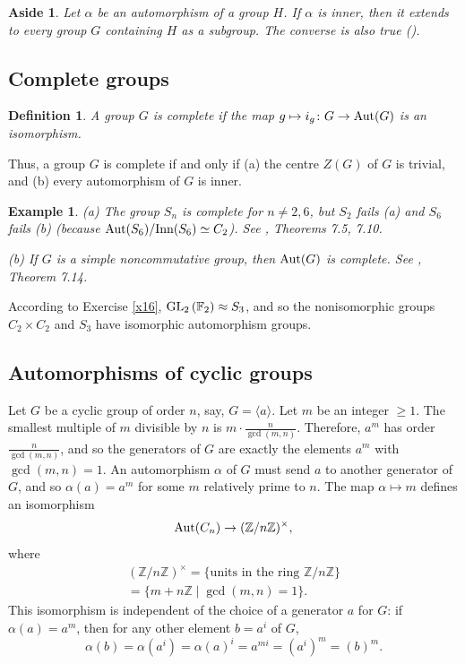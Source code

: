 \documentclass[a4paper,11pt,final]{memoir}%
\newtheorem{definition}[X]{Definition}
\newtheorem{example}[X]{Example}
\newtheorem{aside}[X]{Aside}
\theoremstyle{nonumberplain}
\begin{document}
\begin{aside}
\label{it100b}Let $\alpha$ be an automorphism of a group $H$. If $\alpha$ is
inner, then it extends to every group $G$ containing $H$ as a subgroup. The
converse is also true (\cite{schupp1987}).
\end{aside}

\subsection{Complete groups}

\begin{definition}
\label{it00b}A group $G$ is \emph{complete\/}%
if the map $g\mapsto i_{g}\colon G\rightarrow\operatorname{Aut}(G)$ is an isomorphism.
\end{definition}

Thus, a group $G$ is complete if and only if (a) the centre $Z(G)$ of $G$ is
trivial, and (b) every automorphism of $G$ is inner.

\begin{example}
\label{it09} (a) The group $S_{n}$ is complete for $n\neq2,6$, but $S_{2}$
fails (a) and $S_{6}$ fails (b) (because $\operatorname{Aut}(S_{6})/\text{Inn}(S_{6})\simeq
C_{2}$). See \cite{rotman1995}, Theorems 7.5, 7.10.

(b) If $G$ is a simple noncommutative group, then $\operatorname{Aut}(G)$ is complete. See
\cite{rotman1995}, Theorem 7.14.
\end{example}

According to Exercise \ref{x16}, $\operatorname{GL}_{2}\left(  \mathbb{F}{}_{2}\right)
\approx S_{3}$, and so the nonisomorphic groups $C_{2}\times C_{2}$ and
$S_{3}$ have isomorphic automorphism groups.

\subsection{Automorphisms of cyclic groups}

Let $G$ be a cyclic group of order $n$, say, $G=\langle a\rangle$. Let $m$ be
an integer $\geq1$. The smallest multiple of $m$ divisible by $n$ is
$m\cdot\frac{n}{\gcd(m,n)}$. Therefore, $a^{m}$ has order $\frac{n}{\gcd
(m,n)}$, and so the generators of $G$ are exactly the elements $a^{m}$ with
$\gcd(m,n)=1$. An automorphism $\alpha$ of $G$ must send $a$ to another
generator of $G$, and so $\alpha(a)=a^{m}$ for some $m$ relatively prime to
$n$. The map $\alpha\mapsto m$ defines an isomorphism
\[
\operatorname{Aut}(C_{n})\rightarrow(\mathbb{Z}/n\mathbb{Z})^{\times},
\]
where
\begin{align*}
(\mathbb{Z}/n\mathbb{Z})^{\times}=\{\text{units in the ring }\mathbb{Z}%
/n\mathbb{Z}\}\\
=\{m+n\mathbb{Z}\mid\gcd(m,n)=1\}.
\end{align*}
This isomorphism is independent of the choice of a generator $a$ for $G$: if
$\alpha(a)=a^{m}$, then for any other element $b=a^{i}$ of $G$,
\[
\alpha(b)=\alpha(a^{i})=\alpha(a)^{i}=a^{mi}=(a^{i})^{m}=(b)^{m}.
\]
\end{document}
